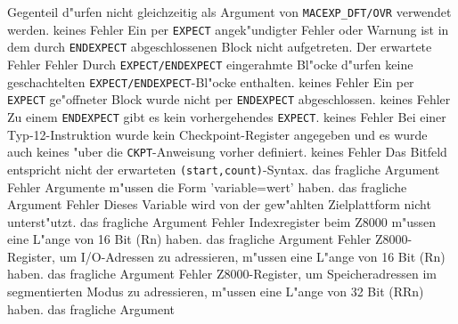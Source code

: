\documentclass[12pt,a4paper,twoside]{report}
\newcommand{\tty}[1]{{\tt #1}}
\begin{document}
\begin{description}
{                Gegenteil d"urfen nicht gleichzeitig als Argument
                von \tty{MACEXP\_DFT/OVR} verwendet werden.}
               {keines}
               {Fehler}
               {Ein per {\tt EXPECT} angek"undigter Fehler oder Warnung ist
                in dem durch {\tt ENDEXPECT} abgeschlossenen Block nicht aufgetreten.}
               {Der erwartete Fehler}
               {Fehler}
               {Durch {\tt EXPECT/ENDEXPECT} eingerahmte Bl"ocke d"urfen keine
                geschachtelten {\tt EXPECT/ENDEXPECT}-Bl"ocke enthalten.}
               {keines}
               {Fehler}
               {Ein per {\tt EXPECT} ge"offneter Block wurde nicht per
                {\tt ENDEXPECT} abgeschlossen.}
               {keines}
               {Fehler}
               {Zu einem {\tt ENDEXPECT} gibt es kein vorhergehendes {\tt EXPECT}.}
               {keines}
               {Fehler}
               {Bei einer Typ-12-Instruktion wurde kein Checkpoint-Register angegeben
                und es wurde auch keines "uber die {\tt CKPT}-Anweisung vorher definiert.}
               {keines}
               {Fehler}
               {Das Bitfeld entspricht nicht der erwarteten {\tt (start,count)}-Syntax.}
               {das fragliche Argument}
               {Fehler}
               {Argumente m"ussen die Form 'variable=wert' haben.}
               {das fragliche Argument}
               {Fehler}
               {Dieses Variable wird von der gew"ahlten Zielplattform nicht unterst"utzt.}
               {das fragliche Argument}
               {Fehler}
               {Indexregister beim Z8000 m"ussen eine L"ange von 16 Bit (Rn) haben.}
               {das fragliche Argument}
               {Fehler}
               {Z8000-Register, um I/O-Adressen zu adressieren, m"ussen eine L"ange von 16 Bit (Rn) haben.}
               {das fragliche Argument}
               {Fehler}
               {Z8000-Register, um Speicheradressen im segmentierten Modus zu adressieren, m"ussen
                eine L"ange von 32 Bit (RRn) haben.}
               {das fragliche Argument}

\end{description}
\end{document}
